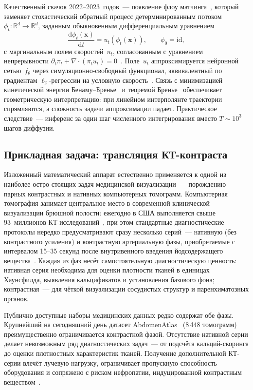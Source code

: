 Качественный скачок 2022--2023~годов~--- появление флоу матчинга~\cite{lipman2022flow, albergo2022building, liu2022flow}, который заменяет стохастический обратный процесс детерминированным потоком~$\phi_t:\mathbb{R}^d\to\mathbb{R}^d$, заданным обыкновенным дифференциальным уравнением
\[
    \frac{\mathrm{d}\phi_t(\mathbf{x})}{\mathrm{d}t} = u_t(\phi_t(\mathbf{x})), \qquad \phi_0=\mathrm{id},
\]
с маргинальным полем скоростей~$u_t$, согласованным с уравнением непрерывности $\partial_t\pi_t+\nabla\!\cdot\!(\pi_t u_t)=0$~\cite{villani2008optimal}. Поле~$u_t$ аппроксимируется нейронной сетью~$f_\theta$ через симуляционно-свободный функционал, эквивалентный по градиентам $\ell_2$-регрессии на условную скорость~\cite{lipman2022flow}. Связь с минимизацией кинетической энергии Бенаму--Бренье~\cite{benamou2000computational} и теоремой Бренье~\cite{brenier1991polar} обеспечивает геометрическую интерпретацию: при линейном интерполянте траектории спрямляются, а сложность задачи аппроксимации падает. Практическое следствие~--- инференс за один шаг численного интегрирования вместо $T\sim10^3$ шагов диффузии.

\subsection*{Прикладная задача: трансляция КТ-контраста}

Изложенный математический аппарат естественно применяется к одной из наиболее остро стоящих задач медицинской визуализации~--- порождению парных контрастных и нативных компьютерных томограмм. Компьютерная томография занимает центральное место в современной клинической визуализации брюшной полости: ежегодно в США выполняется свыше 93~миллионов КТ-исследований~\cite{10.1001/jamainternmed.2025.0505}, при этом стандартные диагностические протоколы нередко предусматривают сразу несколько серий~--- нативную (без контрастного усиления) и контрастную артериальную фазы, приобретаемые с интервалом 15--35 секунд после внутривенного введения йодсодержащего вещества~\cite{MayoSmith2017ManagementOI}. Каждая из фаз несёт самостоятельную диагностическую ценность: нативная серия необходима для оценки плотности тканей в единицах Хаунсфилда, выявления кальцификатов и установления базового фона; контрастная~--- для чёткой визуализации сосудистых структур и паренхиматозных органов.

Публично доступные наборы медицинских данных редко содержат обе фазы. Крупнейший на сегодняшний день датасет AbdomenAtlas~\cite{li2024abdomenatlas} (8\,448 томограмм) преимущественно ограничивается контрастной фазой. Отсутствие нативной серии делает невозможным ряд диагностических задач~--- от подсчёта кальций-скоринга до оценки плотностных характеристик тканей. Получение дополнительной КТ-серии влечёт лучевую нагрузку, ограничивает пропускную способность оборудования и сопряжено с риском нефропатии, индуцированной контрастным веществом~\cite{doi:10.1148/radiol.2392050413}.

